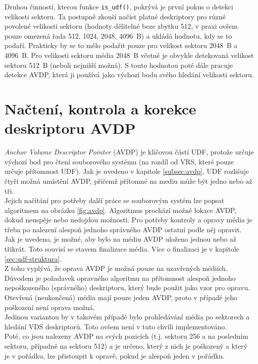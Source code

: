 Druhou činností, kterou funkce \texttt{is\_udf()}, pokrývá je první pokus o detekci velikosti sektoru. Ta postupně zkouší načíst platné deskriptory pro různé povolené velikosti sektoru (hodnoty dělitelné beze zbytku 512, v praxi ovšem pouze omezená řada 512, 1024, 2048, 4096~B) a ukládá hodnotu, kdy se to podaří. Prakticky by se to mělo podařit pouze pro velikost sektoru 2048~B a 4096~B. Pro velikosti sektoru média 2048~B včetně je obvykle detekovaná velikost sektoru 512~B (neboli nejnižší možná). S touto hodnotou poté dále pracuje detekce AVDP, která ji používá jako výchozí bodu svého hledání velikosti sektoru.

\section{Načtení, kontrola a korekce deskriptoru AVDP}
\label{sec:nacteni-a-oprava-avdp}
\textit{Anchor Volume Descriptor Pointer} (AVDP) je klíčovou částí UDF, protože určuje výchozí bod pro čtení souborového systému (na rozdíl od VRS, které pouze určuje přítomnost UDF). Jak je uvedeno v kapitole \ref{subsec:avdp}, UDF rozlišuje čtyři možná umístění AVDP, přičemž přítomné na mediu může být jedno nebo až tři.\\
Jejich načítání pro potřeby další práce se souborovým systém lze popsat algoritmem na obrázku \ref{fig:avdp}. Algoritmus prochází možné lokace AVDP, dokud neuspěje nebo nedojdou možnosti. Pro potřeby kontroly a opravy média je třeba po nalezení alespoň jednoho správného AVDP ostatní podle něj opravit.\\
Jak je uvedeno, je možné, aby bylo na médiu AVDP uloženo jednou nebo až třikrát. Toto souvisí se stavem finalizace média. Více o finalizaci je v kapitole \ref{sec:udf-struktura}.\\
Z toho vyplývá, že oprava AVDP je možná pouze na uzavřených médiích. Důvodem je požadavek opravného algoritmu na přítomnost alespoň jednoho nepoškozeného (správného) deskriptoru, který bude použit jako vzor pro opravu. Otevřená (neukončená) média mají pouze jeden AVDP, proto v případě jeho poškození není oprava možná.\\
Jedinou variantou by v takovém případě bylo prohledávání média po sektorech a hledání VDS deskriptorů. Toto ovšem není v tuto chvíli implementováno.\\
Poté, co jsou nalezeny AVDP na svých pozicích (t.j. sektoru 256 a na posledním sektoru, případně na sektoru 512) a je určeno, který z nich je poškozený a který je v pořádku, lze přistoupit k opravě, pokud je alespoň jeden v pořádku.\\

